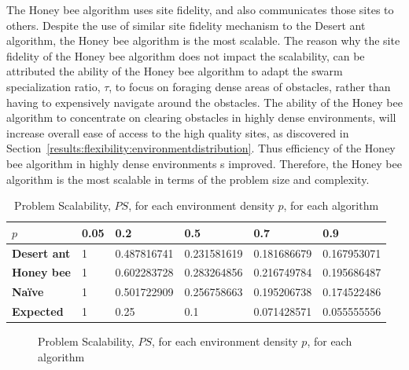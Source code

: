 The Honey bee algorithm uses site fidelity, and also communicates those sites to others. Despite the use of similar site fidelity mechanism to the Desert ant algorithm, the Honey bee algorithm is the most scalable. The reason why the site fidelity of the Honey bee algorithm does not impact the scalability, can be attributed the ability of the Honey bee algorithm to adapt the swarm specialization ratio, $\tau$, to focus on foraging dense areas of obstacles, rather than having to expensively navigate around the obstacles. The ability of the Honey bee algorithm to concentrate on clearing obstacles in highly dense environments, will increase overall ease of access to the high quality sites, as discovered in Section~\ref{results:flexibility:environmentdistribution}. Thus efficiency of the Honey bee algorithm in highly dense environments s improved. Therefore, the Honey bee algorithm is the most scalable in terms of the problem size and complexity.

\begin{table}[]
\centering
\caption{Problem Scalability, $PS$, for each environment density $p$, for each algorithm}
\label{table:problemscalability}
\begin{tabular}{@{}llllll@{}}
\toprule
\textbf{$p$}                  & \textbf{0.05} & \textbf{0.2        } & \textbf{0.5}         & \textbf{0.7}         & \textbf{0.9}         \\ \midrule
\textbf{Desert ant}           & 1    & 0.487816741 & 0.231581619 & 0.181686679 & 0.167953071 \\
\textbf{Honey bee}            & 1    & 0.602283728 & 0.283264856 & 0.216749784 & 0.195686487 \\
\textbf{Na\"ive}              & 1    & 0.501722909 & 0.256758663 & 0.195206738 & 0.174522486 \\
\textbf{Expected} & 1    & 0.25        & 0.1         & 0.071428571 & 0.055555556 \\ \bottomrule
\end{tabular}
\end{table}

\begin{figure}[!htb]
\centering
\resizebox{\textwidth}{!}{}
\caption{Problem Scalability, $PS$, for each environment density $p$, for each algorithm}
\label{fig:problemscalability}
\end{figure}

